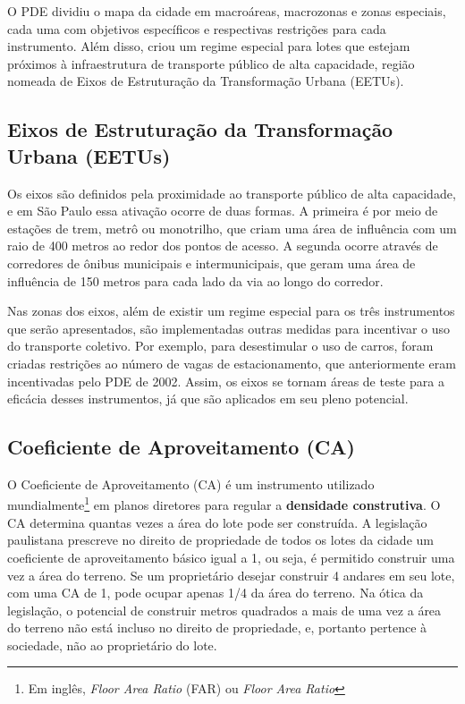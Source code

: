 O PDE dividiu o mapa da cidade em macroáreas, macrozonas e zonas especiais, cada uma com objetivos específicos e respectivas restrições para cada instrumento. Além disso, criou um regime especial para lotes que estejam próximos à infraestrutura de transporte público de alta capacidade, região nomeada de Eixos de Estruturação da Transformação Urbana (EETUs). 

\subsection*{Eixos de Estruturação da Transformação Urbana (EETUs)}

Os eixos são definidos pela proximidade ao transporte público de alta capacidade, e em São Paulo essa ativação ocorre de duas formas. A primeira é por meio de estações de trem, metrô ou monotrilho, que criam uma área de influência com um raio de 400 metros ao redor dos pontos de acesso. A segunda ocorre através de corredores de ônibus municipais e intermunicipais, que geram uma área de influência de 150 metros para cada lado da via ao longo do corredor.

Nas zonas dos eixos, além de existir um regime especial para os três instrumentos que serão apresentados, são implementadas outras medidas para incentivar o uso do transporte coletivo. Por exemplo, para desestimular o uso de carros, foram criadas restrições ao número de vagas de estacionamento, que anteriormente eram incentivadas pelo PDE de 2002. Assim, os eixos se tornam áreas de teste para a eficácia desses instrumentos, já que são aplicados em seu pleno potencial.

\subsection*{Coeficiente de Aproveitamento (CA)}

O Coeficiente de Aproveitamento (CA) é um instrumento utilizado mundialmente\footnote{Em inglês, \textit{Floor Area Ratio} (FAR) ou \textit{Floor Area Ratio}} em planos diretores para regular a \textbf{densidade construtiva}. O CA determina quantas vezes a área do lote pode ser construída. A legislação paulistana prescreve no direito de propriedade de todos os lotes da cidade um coeficiente de aproveitamento básico igual a 1, ou seja, é permitido construir uma vez a área do terreno. Se um proprietário desejar construir 4 andares em seu lote, com uma CA de 1, pode ocupar apenas 1/4 da área do terreno. Na ótica da legislação, o potencial de construir metros quadrados a mais de uma vez a área do terreno não está incluso no direito de propriedade, e, portanto pertence à sociedade, não ao proprietário do lote.

